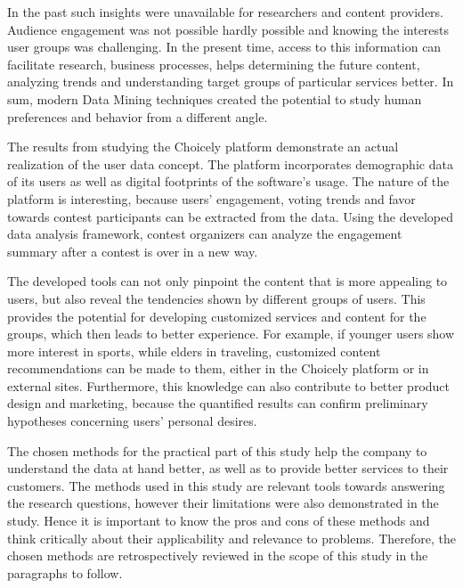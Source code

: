 In the past such insights were unavailable for researchers and content providers. Audience engagement was not possible hardly possible and knowing the interests user groups was challenging. In the present time, access to this information can facilitate research, business processes, helps determining the future content, analyzing trends and understanding target groups of particular services better. In sum, modern Data Mining techniques created the potential to study human preferences and behavior from a different angle.

The results from studying the Choicely platform demonstrate an actual realization of the user data concept. The platform incorporates demographic data of its users as well as digital footprints of the software's usage. The nature of the platform is interesting, because users' engagement, voting trends and favor towards contest participants can be extracted from the data. Using the developed data analysis framework, contest organizers can analyze the engagement summary after a contest is over in a new way. 

The developed tools can not only pinpoint the content that is more appealing to users, but also reveal the tendencies shown by different groups of users. This provides the potential for developing customized services and content for the groups, which then leads to better experience. For example, if younger users show more interest in sports, while elders in traveling, customized content recommendations can be made to them, either in the Choicely platform or in external sites. Furthermore, this knowledge can also contribute to better product design and marketing, because the quantified results can confirm preliminary hypotheses concerning users' personal desires. 

The chosen methods for the practical part of this study help the company to understand the data at hand better, as well as to provide better services to their customers. The methods used in this study are relevant tools towards answering the research questions, however their limitations were also demonstrated in the study. Hence it is important to know the pros and cons of these methods and think critically about their applicability and relevance to problems. Therefore, the chosen methods are retrospectively reviewed in the scope of this study in the paragraphs to follow.

